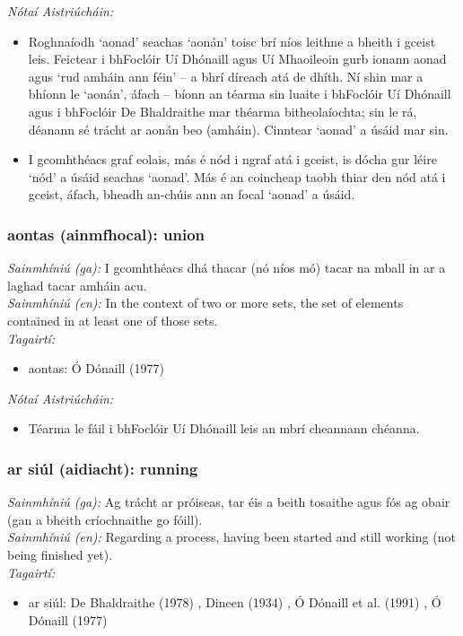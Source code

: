  \noindent \textit{Nótaí Aistriúcháin:}
\begin{itemize}
	\item Roghnaíodh `aonad' seachas `aonán' toisc brí níos leithne a bheith i gceist leis. Feictear i bhFoclóir Uí Dhónaill agus Uí Mhaoileoin gurb ionann aonad agus `rud amháin ann féin' -- a bhrí díreach atá de dhíth. Ní shin mar a bhíonn le `aonán', áfach -- bíonn an téarma sin luaite i bhFoclóir Uí Dhónaill agus i bhFoclóir De Bhaldraithe mar théarma bitheolaíochta; sin le rá, déanann sé trácht ar aonán beo (amháin). Cinntear `aonad' a úsáid mar sin.
	\item I gcomhthéacs graf eolais, más é nód i ngraf atá i gceist, is dócha gur léire `nód' a úsáid seachas `aonad'. Más é an coincheap taobh thiar den nód atá i gceist, áfach, bheadh an-chúis ann an focal `aonad' a úsáid.
\end{itemize}


\subsubsection*{aontas (ainmfhocal): union}
 \noindent \textit{Sainmhíniú (ga):} I gcomhthéacs dhá thacar (nó níos mó) tacar na mball in ar a laghad tacar amháin acu.
\\
 \noindent \textit{Sainmhíniú (en):} In the context of two or more sets, the set of elements contained in at least one of those sets.
\\
 \noindent \textit{Tagairtí:}
\begin{itemize}
	\item aontas: Ó Dónaill (1977) \cite{odonaill}
\end{itemize}

 \noindent \textit{Nótaí Aistriúcháin:}
\begin{itemize}
	\item Téarma le fáil i bhFoclóir Uí Dhónaill leis an mbrí cheannann chéanna.
\end{itemize}


\subsubsection*{ar siúl (aidiacht): running}
 \noindent \textit{Sainmhíniú (ga):} Ag trácht ar próiseas, tar éis a beith tosaithe agus fós ag obair (gan a bheith críochnaithe go fóill).
\\
 \noindent \textit{Sainmhíniú (en):} Regarding a process, having been started and still working (not being finished yet).
\\
 \noindent \textit{Tagairtí:}
\begin{itemize}
	\item ar siúl: De Bhaldraithe (1978) \cite{de-bhaldraithe}, Dineen (1934) \cite{dineen}, Ó Dónaill et al. (1991) \cite{focloir-beag}, Ó Dónaill (1977) \cite{odonaill}
\end{itemize}

